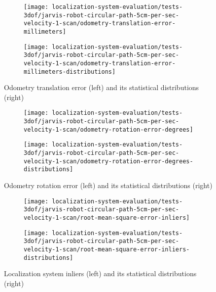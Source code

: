 \begin{figure}[ht]
	\centering
	\begin{subfigure}[h]{.497\textwidth}
		\centering
		\texttt{[image: localization-system-evaluation/tests-3dof/jarvis-robot-circular-path-5cm-per-sec-velocity-1-scan/odometry-translation-error-millimeters]}
	\end{subfigure}
	\begin{subfigure}[h]{.497\textwidth}
		\centering
		\texttt{[image: localization-system-evaluation/tests-3dof/jarvis-robot-circular-path-5cm-per-sec-velocity-1-scan/odometry-translation-error-millimeters-distributions]}
	\end{subfigure}
	\caption{Odometry translation error (left) and its statistical distributions (right)}
	\label{fig:localization-system-evaluation_jarvis-robot-circular-path-5cm-per-sec-velocity-1-scan_odometry-translation-errors}
\end{figure}

\begin{figure}[ht]
	\centering
	\begin{subfigure}[h]{.497\textwidth}
		\centering
		\texttt{[image: localization-system-evaluation/tests-3dof/jarvis-robot-circular-path-5cm-per-sec-velocity-1-scan/odometry-rotation-error-degrees]}
	\end{subfigure}
	\begin{subfigure}[h]{.497\textwidth}
		\centering
		\texttt{[image: localization-system-evaluation/tests-3dof/jarvis-robot-circular-path-5cm-per-sec-velocity-1-scan/odometry-rotation-error-degrees-distributions]}
	\end{subfigure}
	\caption{Odometry rotation error (left) and its statistical distributions (right)}
	\label{fig:localization-system-evaluation_jarvis-robot-circular-path-5cm-per-sec-velocity-1-scan_odometry-rotation-errors}
\end{figure}

\begin{figure}[ht]
	\centering
	\begin{subfigure}[h]{.497\textwidth}
		\centering
		\texttt{[image: localization-system-evaluation/tests-3dof/jarvis-robot-circular-path-5cm-per-sec-velocity-1-scan/root-mean-square-error-inliers]}
	\end{subfigure}
	\begin{subfigure}[h]{.497\textwidth}
		\centering
		\texttt{[image: localization-system-evaluation/tests-3dof/jarvis-robot-circular-path-5cm-per-sec-velocity-1-scan/root-mean-square-error-inliers-distributions]}
	\end{subfigure}
	\caption{Localization system inliers  (left) and its statistical distributions (right)}
	\label{fig:localization-system-evaluation_jarvis-robot-circular-path-5cm-per-sec-velocity-1-scan_inliers-rmse}
\end{figure}

